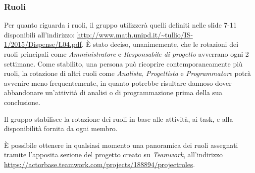 \documentclass[a4paper]{article}
\begin{document}
	\subsubsection{Ruoli}
		Per quanto riguarda i ruoli, il gruppo utilizzerà quelli definiti nelle slide 7-11 disponibili all'indirizzo:
		\url{http://www.math.unipd.it/~tullio/IS-1/2015/Dispense/L04.pdf}. È stato deciso, unanimemente, che le rotazioni dei ruoli principali
		come \emph{Amministratore} e \emph{Responsabile di progetto} avverrano ogni 2 settimane. Come stabilito, una persona può ricoprire
		contemporaneamente più ruoli, la rotazione di altri ruoli come \emph{Analista}, \emph{Progettista} e \emph{Programmatore} potrà avvenire
		meno frequentemente, in quanto potrebbe risultare dannoso dover abbandonare un'attività di analisi o di programmazione prima della sua
		conclusione.

		Il gruppo stabilisce la rotazione dei ruoli in base alle attività, ai task, e alla disponibilità fornita da ogni membro.

		È possibile ottenere in qualsiasi momento una panoramica dei ruoli assegnati tramite l'apposita sezione del
		progetto creato su \emph{Teamwork}, all'indirizzo\\ \url{https://actorbase.teamwork.com/projects/188894/projectroles}.
\end{document}
